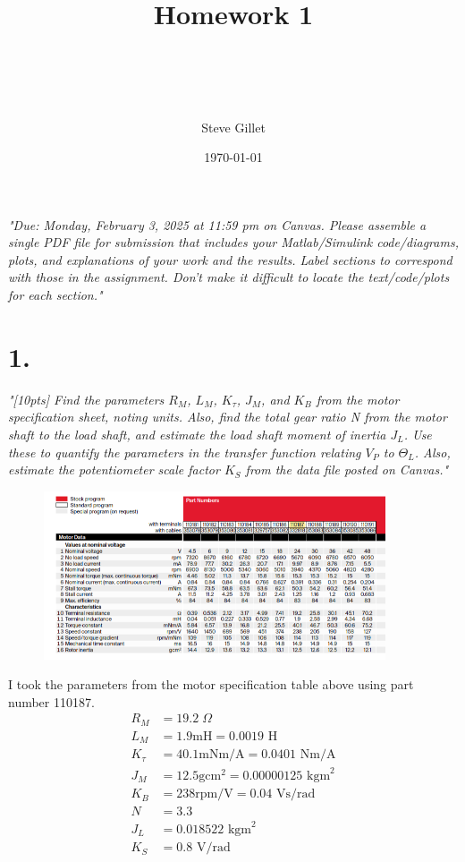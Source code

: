 \documentclass{article}
\title{Homework 1 \\ \className \\ \professorName \\ \taName}
\author{Steve Gillet}
\date{\today}
\begin{document}
\maketitle
\textit{
    "Due: Monday, February 3, 2025 at 11:59 pm on Canvas. Please assemble a single PDF file for
    submission that includes your Matlab/Simulink code/diagrams, plots, and explanations of your
    work and the results. Label sections to correspond with those in the assignment. Don’t make it
    difficult to locate the text/code/plots for each section."
}

\section*{1.}

\textit{
    "[10pts] Find the parameters $R_M$, $L_M$, $K_\tau$, $J_M$, and $K_B$ from the motor specification sheet, noting
    units. Also, find the total gear ratio N from the motor shaft to the load shaft, and estimate the
    load shaft moment of inertia $J_L$. Use these to quantify the parameters in the transfer function
    relating $V_P$ to $\Theta_L$. Also, estimate the potentiometer scale factor $K_S$ from the data file posted on Canvas."
}

\begin{figure}[H]
    \centering
    \includegraphics[width=0.9\textwidth]{motorSpec.png}
\end{figure}

I took the parameters from the motor specification table above using part number 110187.
\begin{align*}
    R_M&=19.2\;\Omega \\
    L_M&=1.9\text{mH}=0.0019\text{ H} \\
    K_\tau&=40.1\text{mNm/A}=0.0401\text{ Nm/A}  \\
    J_M&=12.5\text{gcm}^2=0.00000125\text{ kgm}^2 \\
    K_B&=238\text{rpm/V}=0.04\text{ Vs/rad} \\
    N&=3.3 \\
    J_L&=0.018522\text{ kgm}^2 \\
    K_S&=0.8\text{ V/rad}
\end{align*}
\end{document}

